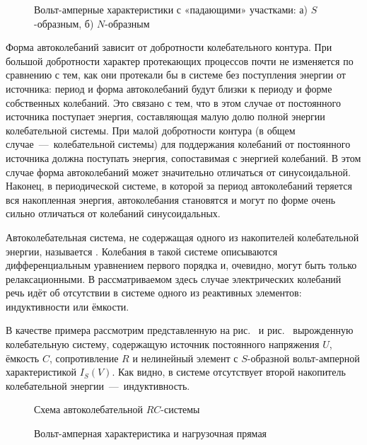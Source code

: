 \begin{figure}
	\centering
	\caption{Вольт-амперные характеристики с «падающими» участками:	а)
$S$-образным, б) $N$-образным}
\end{figure}

Форма автоколебаний зависит от добротности колебательного контура. При большой
добротности характер протекающих процессов почти не изменяется по сравнению с
тем, как они протекали бы в системе без поступления
энергии от источника: период и форма автоколебаний будут близки к периоду и
форме собственных колебаний. Это связано с тем, что в этом случае от постоянного
источника поступает энергия, составляющая малую
долю полной энергии колебательной системы. При малой добротности контура (в
общем случае~---~колебательной системы) для поддержания колебаний от постоянного
источника должна поступать энергия, сопоставимая с энергией колебаний. В этом
случае форма автоколебаний может значительно отличаться от синусоидальной.
Наконец, в периодической системе, в которой за период автоколебаний теряется вся
накопленная энергия, автоколебания становятся  и
могут по форме очень сильно отличаться от колебаний синусоидальных.

Автоколебательная система, не содержащая одного из накопителей колебательной
энергии, называется . Колебания в такой системе
описываются дифференциальным уравнением первого порядка и, очевидно, могут быть
только релаксационными. В рассматриваемом здесь случае электрических колебаний
речь идёт об отсутствии в системе одного из реактивных элементов: индуктивности
или ёмкости.

В качестве примера рассмотрим представленную на рис.~ и
рис.~ вырожденную колебательную систему, содержащую источник
постоянного напряжения $U$, ёмкость $C$, сопротивление $R$ и нелинейный элемент
с $S$-образной вольт-амперной характеристикой $I_S(V)$. Как видно, в системе
отсутствует второй накопитель колебательной энергии~---~индуктивность.

\begin{figure}
	\centering
	\caption{Схема автоколебательной $RC$-системы}
\end{figure}

\begin{figure}
	\centering
	\caption{Вольт-амперная характеристика и нагрузочная прямая}
\end{figure}


